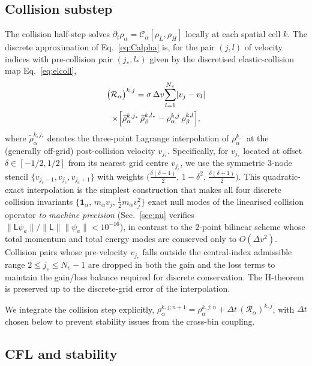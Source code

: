 \documentclass[aps,pre,twocolumn,superscriptaddress,longbibliography,floatfix]{revtex4-2}
\begin{document}
\subsection{Collision substep}

The collision half-step solves
$\partial_t \rho_\alpha = \mathcal{C}_\alpha[\rho_L,\rho_H]$
locally at each spatial cell $k$. The discrete approximation of
Eq.~\eqref{eq:Calpha} is, for the pair $(j,l)$ of velocity
indices with pre-collision pair $(j_*,l_*)$ given by the
discretised elastic-collision map Eq.~\eqref{eq:elcoll},
\begin{multline}
\bigl(\mathcal{R}_\alpha\bigr)^{k,j}
= \sigma\,\Delta v\!\sum_{l=1}^{N_v}\!|v_j-v_l|\\
\times\Bigl[\widetilde\rho_\alpha^{k,j_*}\,
            \widetilde\rho_\beta^{k,l_*}
          -\rho_\alpha^{k,j}\,\rho_\beta^{k,l}\Bigr],
\label{eq:collop}
\end{multline}
where $\widetilde\rho_\alpha^{k,j_*}$ denotes the
three-point Lagrange interpolation of
$\rho_\alpha^{k,\cdot}$ at the (generally off-grid)
post-collision velocity $v_{j_*}$. Specifically, for
$v_{j_*}$ located at offset $\delta\in[-1/2,1/2]$ from its
nearest grid centre $v_{j_c}$, we use the symmetric
3-node stencil $\{v_{j_c-1},v_{j_c},v_{j_c+1}\}$ with
weights
$\bigl(\tfrac{\delta(\delta-1)}{2},\,1-\delta^2,\,
       \tfrac{\delta(\delta+1)}{2}\bigr)$.
This quadratic-exact interpolation is the simplest
construction that makes all four discrete collision
invariants
$\{\mathbf{1}_\alpha,\,m_\alpha v_j,\,
   \tfrac12 m_\alpha v_j^2\}$
exact null modes of the linearised collision operator
\emph{to machine precision} (Sec.~\ref{sec:nu} verifies
$\|\mathsf{L}\psi_a\|/\|\mathsf{L}\|\|\psi_a\|<10^{-16}$),
in contrast to the 2-point bilinear scheme whose total
momentum and total energy modes are conserved only to
$O(\Delta v^2)$. Collision pairs whose pre-velocity
$v_{j_*}$ falls outside the central-index admissible range
$2\leq j_c\leq N_v-1$ are dropped in both the gain and the
loss terms to maintain the gain/loss balance required for
discrete conservation. The H-theorem is preserved up to the
discrete-grid error of the interpolation.

We integrate the collision step explicitly,
$\rho_\alpha^{k,j;n+1}=\rho_\alpha^{k,j;n}+\Delta t\,
(\mathcal{R}_\alpha)^{k,j}$, with $\Delta t$ chosen below to
prevent stability issues from the cross-bin coupling.

\subsection{CFL and stability}
\end{document}
